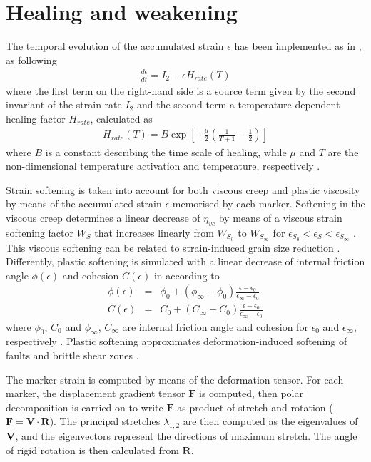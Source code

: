 \section{Healing and weakening}\label{sec:healing}
The temporal evolution of the accumulated strain $\epsilon$ has been implemented as in \citet{Fuchs2019,Fuchs2021}, as following
\begin{eqnarray}\label{eq:healing}
  \frac{d\epsilon}{dt}=I_2 - \epsilon H_{rate}(T)
\end{eqnarray}
where the first term on the right-hand side is a source term given by the second invariant of the strain rate $I_2$ and the second term a
temperature-dependent healing factor $H_{rate}$, calculated as
\begin{eqnarray}\label{eq:healing_rate}
  H_{rate}(T)=B \exp \left[-\frac{\mu}{2}\left(\frac{1}{T+1}-\frac{1}{2}\right)\right]
\end{eqnarray}
where $B$ is a constant describing the time scale of healing, while $\mu$ and $T$ are the non-dimensional temperature activation and temperature,
respectively \citep{Fuchs2019,Fuchs2021}.

Strain softening is taken into account for both viscous creep and plastic viscosity \citep{Huismans2003,Babeyko2005,Huismans2005,Sobolev2005,Warren2008a} by
means of the accumulated strain $\epsilon$ memorised by each marker. Softening in the viscous creep determines a linear decrease of $\eta_{vc}$ by means of a
viscous strain softening factor $W_S$ that increases linearly from $W_{S_0}$ to $W_{S_{\infty}}$ for $\epsilon_{S_0}<\epsilon_S<\epsilon_{S_{\infty}}$ 
\citep{Warren2008a}. This viscous softening can be related to strain-induced grain size reduction \citep{Warren2008a}. Differently, plastic softening is 
simulated with a linear decrease of internal friction angle $\phi(\epsilon)$ and cohesion $C(\epsilon)$ in according to
\begin{eqnarray}
\label{eq:friction1}\phi(\epsilon)&=&\phi_0+(\phi_{\infty}-\phi_0)\frac{\epsilon-\epsilon_0}{\epsilon_{\infty}-\epsilon_0}\\
\label{eq:friction2}C(\epsilon)&=&C_0+(C_{\infty}-C_0)\frac{\epsilon-\epsilon_0}{\epsilon_{\infty}-\epsilon_0}
\end{eqnarray}
where $\phi_0$, $C_0$ and $\phi_{\infty}$, $C_{\infty}$ are internal friction angle and cohesion for $\epsilon_0$ and $\epsilon_{\infty}$, respectively
\citep{Huismans2003,Huismans2005,Warren2008a,Thieulot2014}. Plastic softening approximates deformation-induced softening of faults and brittle shear zones
\citep{Warren2008a}.

The marker strain is computed by means of the deformation tensor. For each marker, the displacement gradient tensor $\textbf{F}$ is computed, then polar decomposition is carried on to write $\textbf{F}$ as product of stretch and rotation ($\textbf{F}=\textbf{V} \cdot \textbf{R}$). The principal stretches $\lambda_{1,2}$ are then computed as the eigenvalues of $\textbf V$, and the eigenvectors represent the directions of maximum stretch. The angle of rigid rotation is then calculated from $\textbf{R}$.